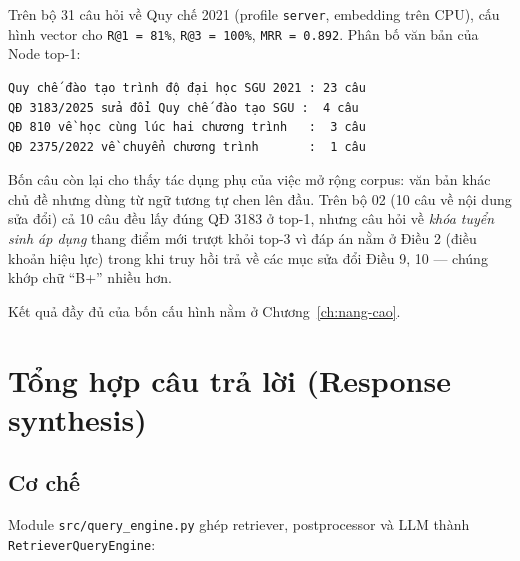 Trên bộ 31 câu hỏi về Quy chế 2021 (profile \texttt{server}, embedding trên CPU), cấu hình vector
cho \texttt{R@1 = 81\%}, \texttt{R@3 = 100\%}, \texttt{MRR = 0.892}. Phân bố văn bản của Node top-1:

\begin{lstlisting}[caption={Văn bản của Node đứng đầu, bộ 01, cấu hình vector.}, label={lst:top1-van-ban}]
Quy chế đào tạo trình độ đại học SGU 2021 : 23 câu
QĐ 3183/2025 sửa đổi Quy chế đào tạo SGU :  4 câu
QĐ 810 về học cùng lúc hai chương trình   :  3 câu
QĐ 2375/2022 về chuyển chương trình       :  1 câu
\end{lstlisting}

Bốn câu còn lại cho thấy tác dụng phụ của việc mở rộng corpus: văn bản khác chủ đề nhưng dùng từ
ngữ tương tự chen lên đầu. Trên bộ 02 (10 câu về nội dung sửa đổi) cả 10 câu đều lấy đúng QĐ 3183
ở top-1, nhưng câu hỏi về \emph{khóa tuyển sinh áp dụng} thang điểm mới trượt khỏi top-3 vì đáp án
nằm ở Điều 2 (điều khoản hiệu lực) trong khi truy hồi trả về các mục sửa đổi Điều 9, 10 --- chúng
khớp chữ ``B+'' nhiều hơn.

Kết quả đầy đủ của bốn cấu hình nằm ở Chương~\ref{ch:nang-cao}.

\section{Tổng hợp câu trả lời (Response synthesis)}
\label{sec:synthesis}

\subsection{Cơ chế}

Module \texttt{src/query\_engine.py} ghép retriever, postprocessor và LLM thành
\texttt{RetrieverQueryEngine}:

